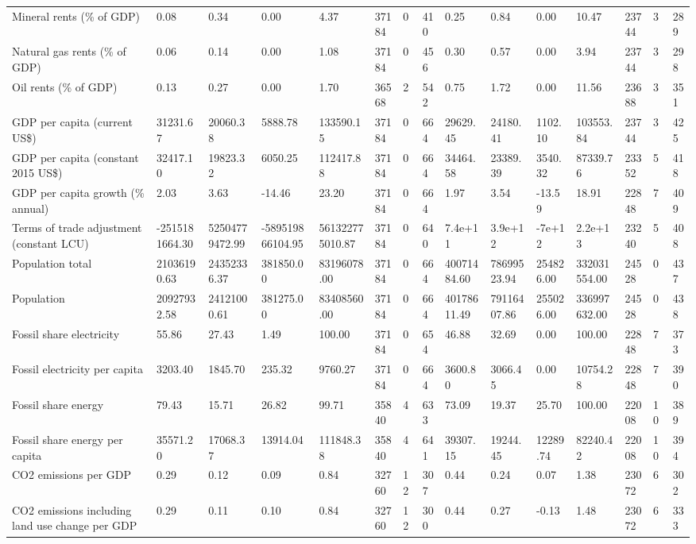 \begin{longtable}{lllllllllllllll}
\addlinespace
Mineral rents (\% of GDP) & 0.08 & 0.34 & 0.00 & 4.37 & 37184 & 0 & 410 & 0.25 & 0.84 & 0.00 & 10.47 & 23744 & 3 & 289\\
Natural gas rents (\% of GDP) & 0.06 & 0.14 & 0.00 & 1.08 & 37184 & 0 & 456 & 0.30 & 0.57 & 0.00 & 3.94 & 23744 & 3 & 298\\
Oil rents (\% of GDP) & 0.13 & 0.27 & 0.00 & 1.70 & 36568 & 2 & 542 & 0.75 & 1.72 & 0.00 & 11.56 & 23688 & 3 & 351\\
GDP per capita (current US\$) & 31231.67 & 20060.38 & 5888.78 & 133590.15 & 37184 & 0 & 664 & 29629.45 & 24180.41 & 1102.10 & 103553.84 & 23744 & 3 & 425\\
GDP per capita (constant 2015 US\$) & 32417.10 & 19823.32 & 6050.25 & 112417.88 & 37184 & 0 & 664 & 34464.58 & 23389.39 & 3540.32 & 87339.76 & 23352 & 5 & 418\\
\addlinespace
GDP per capita growth (\% annual) & 2.03 & 3.63 & -14.46 & 23.20 & 37184 & 0 & 664 & 1.97 & 3.54 & -13.59 & 18.91 & 22848 & 7 & 409\\
Terms of trade adjustment (constant LCU) & -2515181664.30 & 52504779472.99 & -589519866104.95 & 561322775010.87 & 37184 & 0 & 640 & 7.4e+11 & 3.9e+12 & -7e+12 & 2.2e+13 & 23240 & 5 & 408\\
Population total & 21036190.63 & 24352336.37 & 381850.00 & 83196078.00 & 37184 & 0 & 664 & 40071484.60 & 78699523.94 & 254826.00 & 332031554.00 & 24528 & 0 & 437\\
Population & 20927932.58 & 24121000.61 & 381275.00 & 83408560.00 & 37184 & 0 & 664 & 40178611.49 & 79116407.86 & 255026.00 & 336997632.00 & 24528 & 0 & 438\\
Fossil share electricity & 55.86 & 27.43 & 1.49 & 100.00 & 37184 & 0 & 654 & 46.88 & 32.69 & 0.00 & 100.00 & 22848 & 7 & 373\\
\addlinespace
Fossil electricity per capita & 3203.40 & 1845.70 & 235.32 & 9760.27 & 37184 & 0 & 664 & 3600.80 & 3066.45 & 0.00 & 10754.28 & 22848 & 7 & 390\\
Fossil share energy & 79.43 & 15.71 & 26.82 & 99.71 & 35840 & 4 & 633 & 73.09 & 19.37 & 25.70 & 100.00 & 22008 & 10 & 389\\
Fossil share energy per capita & 35571.20 & 17068.37 & 13914.04 & 111848.38 & 35840 & 4 & 641 & 39307.15 & 19244.45 & 12289.74 & 82240.42 & 22008 & 10 & 394\\
CO2 emissions per GDP & 0.29 & 0.12 & 0.09 & 0.84 & 32760 & 12 & 307 & 0.44 & 0.24 & 0.07 & 1.38 & 23072 & 6 & 302\\
CO2 emissions including land use change per GDP & 0.29 & 0.11 & 0.10 & 0.84 & 32760 & 12 & 300 & 0.44 & 0.27 & -0.13 & 1.48 & 23072 & 6 & 333\\

\end{longtable}
